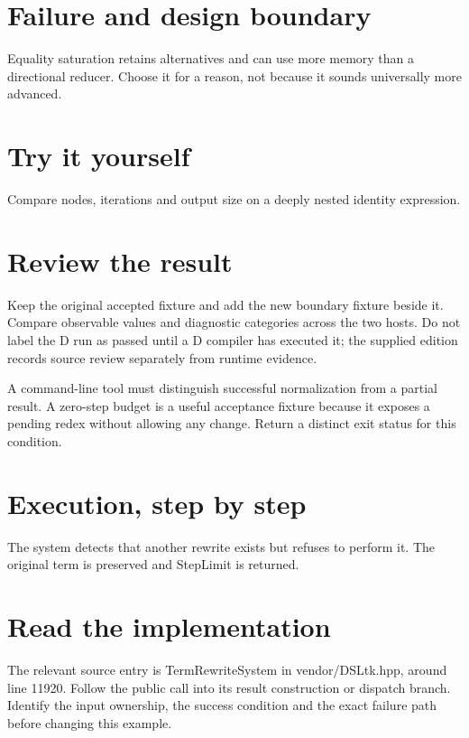 
\section*{Failure and design boundary}
Equality saturation retains alternatives and can use more memory than a directional reducer. Choose it for a reason, not because it sounds universally more advanced.

\section*{Try it yourself}
Compare nodes, iterations and output size on a deeply nested identity expression.

\section*{Review the result}
Keep the original accepted fixture and add the new boundary fixture beside it. Compare observable values and diagnostic categories across the two hosts. Do not label the D run as passed until a D compiler has executed it; the supplied edition records source review separately from runtime evidence.

\clearpage
{}
A command-line tool must distinguish successful normalization from a partial result. A zero-step budget is a useful acceptance fixture because it exposes a pending redex without allowing any change. Return a distinct exit status for this condition.


\section*{Execution, step by step}
The system detects that another rewrite exists but refuses to perform it. The original term is preserved and StepLimit is returned.

\section*{Read the implementation}
The relevant source entry is TermRewriteSystem in vendor/DSLtk.hpp, around line 11920. Follow the public call into its result construction or dispatch branch. Identify the input ownership, the success condition and the exact failure path before changing this example.


